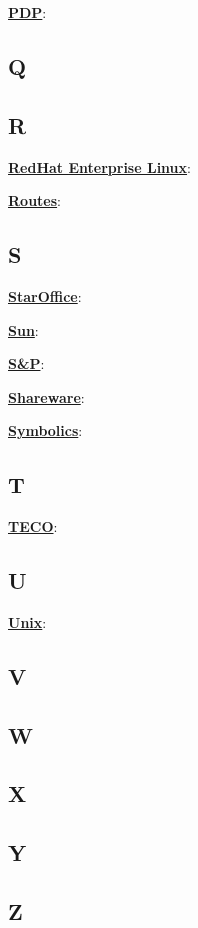 \underline{\textbf{PDP}}: %

\subsection*{Q}

\subsection*{R}

\underline{\textbf{RedHat Enterprise Linux}}: %

\underline{\textbf{Routes}}: %



\subsection*{S}

\underline{\textbf{StarOffice}}: %

\underline{\textbf{Sun}}: 

\underline{\textbf{S\&P}}: %

\underline{\textbf{Shareware}}: %

\underline{\textbf{Symbolics}}: %

\subsection*{T}

\underline{\textbf{TECO}}: %

\subsection*{U}

\underline{\textbf{Unix}}: %

\subsection*{V}

\subsection*{W}

\subsection*{X}

\subsection*{Y}

\subsection*{Z}


	



